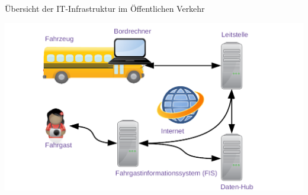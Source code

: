 
\begin{frame}{Übersicht der IT-Infrastruktur im Öffentlichen Verkehr}
  \begin{center}
    \includegraphics[width=1.1\textwidth]{otm-june-2-2021/public-transport.png}
  \end{center}
\end{frame}
